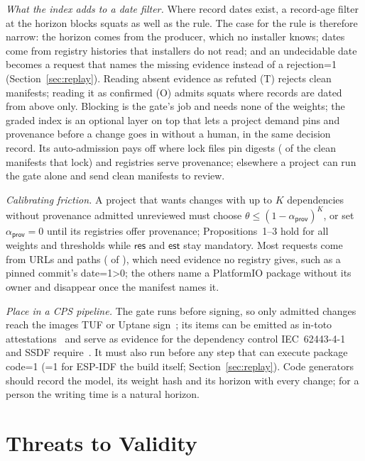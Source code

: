 \documentclass[conference]{IEEEtran}
\providecommand{\rHasReplay}{0}\providecommand{\rHasEspBuild}{0}\providecommand{\rRpNetns}{0}\providecommand{\rValByResponse}{0}\providecommand{\rNoPinBelowTheta}{0}\providecommand{\rHasLock}{0}\providecommand{\rHasAudit}{0}\providecommand{\rHasFamEq}{0}\providecommand{\rMainLock}{0}\providecommand{\rRpLockExec}{0}\providecommand{\rMaxAnsCut}{0}\providecommand{\rReqOnlyUrlPio}{0}\providecommand{\rReqPioSpan}{0}\providecommand{\rHistAfterPThreeUAdmit}{0}\providecommand{\rNGgufIsHorizon}{0}\providecommand{\rRemovedModel}{?}\providecommand{\rRemovedAnswers}{?}\providecommand{\rSqAbsRestOwned}{0}\providecommand{\rSqAbsRest}{0}\providecommand{\rNRemovedModels}{0}\providecommand{\rPostHorizonShiftSame}{0}
\newcommand{\sres}{\mathsf{res}}
\newcommand{\sest}{\mathsf{est}}
\newcommand{\sprov}{\mathsf{prov}}
\begin{document}
\emph{What the index adds to a date filter.} Where record dates exist, a record-age filter at the horizon blocks squats
as well as the rule. The case for the rule is therefore narrow:
the horizon comes from the producer, which no installer knows; dates come from registry histories that installers do
not read; and an undecidable date becomes a request that names the missing evidence instead of a
rejection\ifnum\rHasReplay=1{} (Section~\ref{sec:replay})\fi. Reading absent evidence as refuted (T) rejects clean
manifests; reading it as confirmed (O) admits squats where records are dated from above only. Blocking is the gate's
job and needs none of the weights; the graded index is an optional layer on top that lets a project demand pins and
provenance before a change goes in without a human, in the same decision record. Its auto-admission pays off where
lock files pin digests (\rBuildCleanAdmitPct{} of the clean manifests that lock) and registries serve provenance;
elsewhere a project can run the gate alone and send clean manifests to review.

\emph{Calibrating friction.} A project that wants changes with up to $K$ dependencies without provenance admitted
unreviewed must choose $\theta\le(1-\alpha_{\sprov})^{K}$, or set $\alpha_{\sprov}=0$ until its registries offer
provenance; Propositions~1--3 hold for all weights and thresholds while $\sres$ and $\sest$ stay mandatory. Most requests come
from URLs and paths (\rReqUrlPath{} of \rGSciiCRequest), which need evidence no registry gives, such as a pinned
commit's date\ifnum\rReqOnlyUrlPio=1\ifnum\rReqPioSpan>0; the others name a PlatformIO package without its owner and
disappear once the manifest names it\fi\fi.

\emph{Place in a CPS pipeline.} The gate runs before signing, so only admitted changes reach the images TUF or Uptane
sign~\cite{samuel2010tuf,kuppusamy2016uptane}; its items can be emitted as in-toto
attestations~\cite{torresarias2019intoto} and serve as evidence for the dependency control IEC~62443-4-1 and SSDF
require~\cite{iec62443-4-1,nist800218}. It must also run before any step that can execute package
code\ifnum\rHasReplay=1{} (\ifnum\rHasEspBuild=1 for ESP-IDF the build itself; \fi Section~\ref{sec:replay})\fi. Code generators should record the model, its weight hash and
its horizon with every change; for a person the writing time is a natural horizon.

\section{Threats to Validity}
\label{sec:threats}
\end{document}
